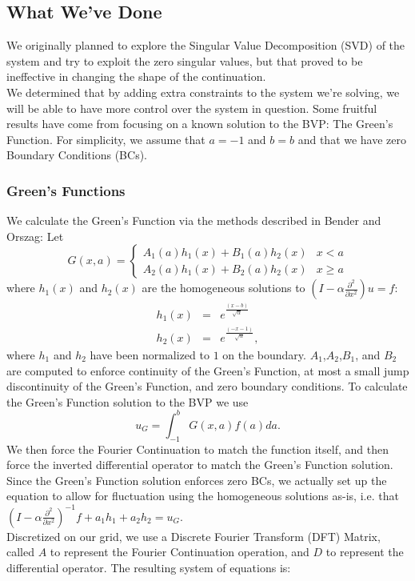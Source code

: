 \documentclass[11pt]{amsart}
\begin{document}
\subsection{What We've Done} 
We originally planned to explore the Singular Value Decomposition (SVD) of the system and try to exploit the zero singular values, but that proved to be ineffective in changing the shape of the continuation.  \\
We determined that by adding extra constraints to the system we're solving, we will be able to have more control over the system in question. Some fruitful results have come from focusing on a known solution to the BVP: The Green's Function. For simplicity, we assume that $a=-1$ and $b=b$ and that we have zero Boundary Conditions (BCs). 
\subsubsection{Green's Functions}
We calculate the Green's Function via the methods described in Bender and Orszag: Let 
\begin{equation}
G(x,a)=\begin{cases}
A_1(a)h_1(x)+B_1(a)h_2(x) & x<a \\
A_2(a)h_1(x)+B_2(a)h_2(x) & x \geq a
\end{cases}
\end{equation}
where $h_1(x)$ and $h_2(x)$ are the homogeneous solutions to  $(I-\alpha \frac{\partial^2}{\partial x^2})u=f$:
\begin{eqnarray}
h_1(x) &=& e^{\frac{(x-b)}{\sqrt{\alpha}}} \\
h_2(x) &=& e^{\frac{(-x-1)}{\sqrt{\alpha}}},
\end{eqnarray}
where $h_1$ and $h_2$ have been normalized to $1$ on the boundary.  $A_1$,$A_2$,$B_1$, and $B_2$ are computed to enforce continuity of the Green's Function, at most a small jump discontinuity of the Green's Function, and zero boundary conditions. 
To calculate the Green's Function solution to the BVP we use
\begin{equation}
u_G=\int_{-1}^b G(x,a)f(a)da.
\end{equation}
We then force the Fourier Continuation to match the function itself, and then force the inverted differential operator to match the Green's Function solution.  Since the Green's Function solution enforces zero BCs, we actually set up the equation to allow for fluctuation using the homogeneous solutions as-is, i.e. that  $(I-\alpha \frac{\partial^2}{\partial x^2})^{-1}f + a_1 h_1 + a_2 h_2 = u_G$. \\
Discretized on our grid, we use a Discrete Fourier Transform (DFT) Matrix, called $A$ to represent the Fourier Continuation operation, and $D$ to represent the differential operator.  The resulting system of equations is: 
\end{document}
